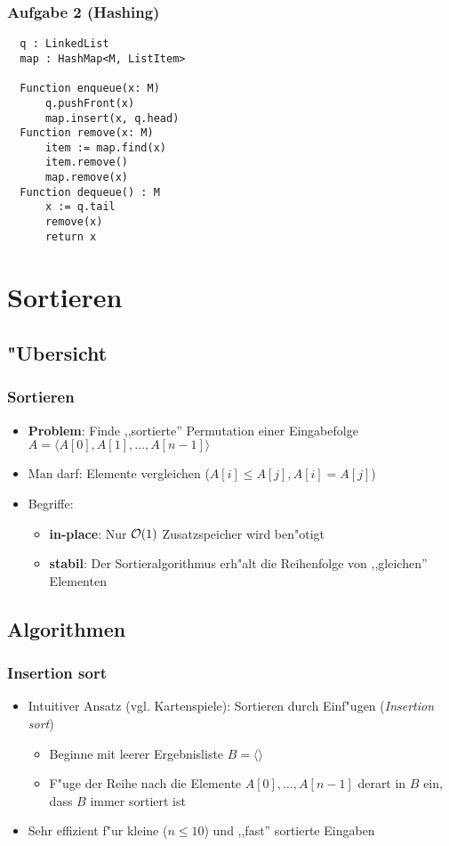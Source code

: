 \begin{frame}[fragile]
  \frametitle{Aufgabe 2 (Hashing)}
  \begin{lstlisting}
  q : LinkedList
  map : HashMap<M, ListItem>

  Function enqueue(x: M)
      q.pushFront(x)
      map.insert(x, q.head)
  Function remove(x: M)
      item := map.find(x)
      item.remove()
      map.remove(x)
  Function dequeue() : M
      x := q.tail
      remove(x)
      return x
  \end{lstlisting}
\end{frame}

\section{Sortieren}
\subsection{"Ubersicht}
\begin{frame}
  \frametitle{Sortieren}
  \begin{itemize}
  \item \textbf{Problem}: Finde ,,sortierte'' Permutation einer Eingabefolge
                         $A = \langle A[0], A[1], \ldots, A[n-1] \rangle$
  \item Man darf: Elemente vergleichen ($A[i] \leq A[j], A[i] = A[j]$)
  \item Begriffe:
    \begin{itemize}
    \item \textbf{in-place}: Nur $\mathcal{O}(1)$ Zusatzspeicher wird ben"otigt
    \item \textbf{stabil}: Der Sortieralgorithmus erh"alt die Reihenfolge von
                           ,,gleichen'' Elementen
    \end{itemize}
  \end{itemize}
\end{frame}

\subsection{Algorithmen}

\begin{frame}
  \frametitle{Insertion sort}
  \begin{itemize}
  \item Intuitiver Ansatz (vgl. Kartenspiele): Sortieren durch Einf"ugen
        (\emph{Insertion sort})
  \begin{itemize}
  \item Beginne mit leerer Ergebnisliste $B = \langle\rangle$
  \item F"uge der Reihe nach die Elemente $A[0],\ldots,A[n-1]$ derart in $B$ ein,
        dass $B$ immer sortiert ist
  \end{itemize}
  \item Sehr effizient f"ur kleine ($n \leq 10$) und ,,fast'' sortierte Eingaben
  \end{itemize}
\end{frame}

